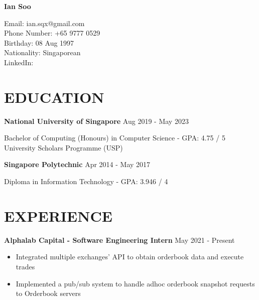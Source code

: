 \documentclass[11pt]{article} %
\begin{document}

{\LARGE\bfseries Ian Soo} %

Email: ian.sqx@gmail.com\\
Phone Number: +65 9777 0529\\
Birthday: 08 Aug 1997\\
Nationality: Singaporean\\
LinkedIn: \href{https://www.linkedin.com/in/sooian/}{\color{black}{https://www.linkedin.com/in/sooian/}}


\section*{EDUCATION}

\textbf{National University of Singapore} \hfill Aug 2019 - May 2023

Bachelor of Computing (Honours) in Computer Science - GPA: 4.75 / 5\\
University Scholars Programme (USP)

\medskip

\textbf{Singapore Polytechnic} \hfill Apr 2014 - May 2017

Diploma in Information Technology - GPA: 3.946 / 4


\section*{EXPERIENCE}

\textbf{Alphalab Capital - Software Engineering Intern} \hfill May 2021 - Present

\smallskip
\begin{itemize}

    \item Integrated multiple exchanges' API to obtain orderbook data and execute trades
    \item Implemented a pub/sub system to handle adhoc orderbook snapshot requests to Orderbook servers

\end{itemize}
\end{document}
